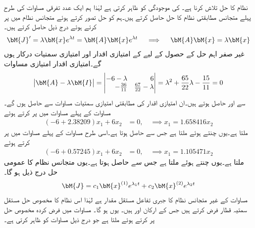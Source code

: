  نظام کا حل تلاش کرنا ہے۔ کی موجودگی   کو ظاہر کرتی ہے لہٰذا ہم ایک عدد تفرقی مساوات کی طرح پہلے متجانس مطابقتی نظام  کا حل حاصل کرتے ہیں۔ہم  کو حل تصور کرتے ہوئے متجانس نظام میں پر کرتے ہوئے درج ذیل حاصل کرتے ہیں۔
\begin{align*}
\bM{J}'=\lambda \bM{x}e^{\lambda t}=\bM{A}\bM{x}e^{\lambda t} \quad \implies \quad \bM{A}\bM{x}=\lambda \bM{x}
\end{align*}
غیر صفر اہم حل کے حصول کے لیے  کے امتیازی اقدار اور امتیازی سمتیات درکار ہوں گے۔امتیازی اقدار امتیازی مساوات
\begin{align*}
\abs{\bM{A}-\lambda \bM{I}}=\begin{vmatrix*}[r] -6-\lambda& 6 \\-\frac{36}{11}&\frac{67}{22}-\lambda \end{vmatrix*}=\lambda^2+\frac{65}{22}\lambda-\frac{15}{11}=0
\end{align*}
سے  اور  حاصل ہوتے ہیں۔ان امتیازی اقدار کی مطابقتی امتیازی سمتیات مساوات  سے حاصل ہوں گے۔مساوات  کے پہلے مساوات میں   پر کرتے ہوئے 
\begin{align*}
(-6+2.38209)x_1+6x_2&=0,\quad \implies x_1=1.658416x_2
\end{align*}
ملتا ہے۔یوں  چنتے ہوئے  ملتا ہے جس سے  حاصل ہوتا ہے۔اسی طرح مساوات  کے پہلے مساوات میں   پر کرتے ہوئے 
\begin{align*}
(-6+0.57245)x_1+6x_2&=0,\quad \implies x_1=1.105471x_2
\end{align*}
ملتا ہے۔یوں  چنتے ہوئے  ملتا ہے جس سے  حاصل ہوتا ہے۔یوں متجانس نظام کا عمومی حل درج ذیل ہو گا۔
\begin{align}
\bM{J}=c_1\bM{x}^{(1)}e^{\lambda_1 t}+c_2 \bM{x}^{(2)}e^{\lambda_2 t}
\end{align}
مساوات  کے غیر متجانس نظام کا جبری تفاعل  مستقل مقدار ہے لہٰذا اس نظام کا مخصوص حل  مستقل سمتیہ قطار  فرض کرتے ہیں جس کے ارکان  اور  ہیں۔ یوں  ہو گا۔ مساوات  میں فرض کردہ مخصوص حل پر کرتے ہوئے   ملتا ہے جو درج ذیل  مساوات کو ظاہر کرتی ہے۔
